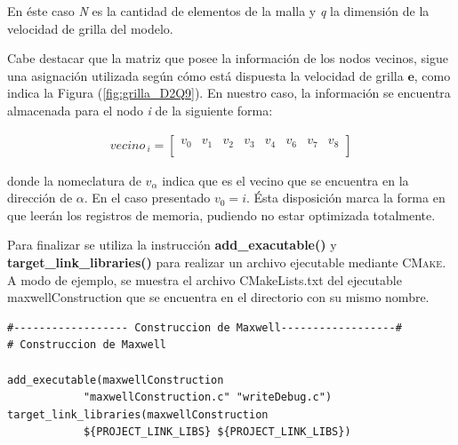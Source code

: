 En éste caso \textit{N} es la cantidad de elementos de la malla y \textit{q} la dimensión de la velocidad de grilla del modelo.

Cabe destacar que la matriz que posee la información de los nodos vecinos, sigue una asignación utilizada según cómo está dispuesta la velocidad de grilla $\mathbf{e}$, como indica la Figura (\ref{fig:grilla_D2Q9}). En nuestro caso, la información se encuentra almacenada para el nodo \textit{i} de la siguiente forma:

\begin{align*}
	vecino_{\>i} =
	\begin{bmatrix}
	v_0 & v_1 & v_2 & v_3 & v_4 & v_6 & v_7 & v_8 \\
	\end{bmatrix}
\end{align*}

donde la nomeclatura de $v_\alpha$ indica que es el vecino que se encuentra en la dirección de $\alpha$. En el caso presentado $v_0 = i$. Ésta disposición marca la forma en que leerán los registros de memoria, pudiendo no estar optimizada totalmente.

Para finalizar se utiliza la instrucción \textbf{add\_exacutable()} y \textbf{target\_link\_libraries()} para realizar un archivo ejecutable mediante \textsc{CMake}. A modo de ejemplo, se muestra el archivo CMakeLists.txt del ejecutable maxwellConstruction que se encuentra en el directorio con su mismo nombre.

{\footnotesize
	\begin{frame}{}
		\begin{lstlisting}[frame=single]
#------------------ Construccion de Maxwell------------------#
# Construccion de Maxwell

add_executable(maxwellConstruction 
			"maxwellConstruction.c" "writeDebug.c")
target_link_libraries(maxwellConstruction 
			${PROJECT_LINK_LIBS} ${PROJECT_LINK_LIBS})

		
		\end{lstlisting}
		
	\end{frame}
}


